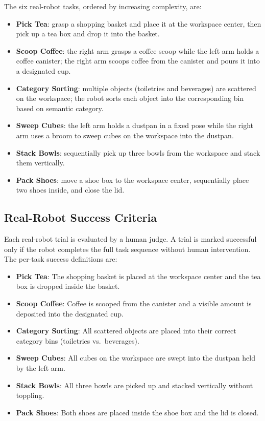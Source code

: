 \documentclass{llmxive}
\begin{document}
The six real-robot tasks, ordered by increasing complexity, are:

\begin{itemize}
    \item \textbf{Pick Tea}: grasp a shopping basket and place it at the workspace center, then pick up a tea box and drop it into the basket.
    \item \textbf{Scoop Coffee}: the right arm grasps a coffee scoop while the left arm holds a coffee canister; the right arm scoops coffee from the canister and pours it into a designated cup.
    \item \textbf{Category Sorting}: multiple objects (toiletries and beverages) are scattered on the workspace; the robot sorts each object into the corresponding bin based on semantic category.
    \item \textbf{Sweep Cubes}: the left arm holds a dustpan in a fixed pose while the right arm uses a broom to sweep cubes on the workspace into the dustpan.
    \item \textbf{Stack Bowls}: sequentially pick up three bowls from the workspace and stack them vertically.
    \item \textbf{Pack Shoes}: move a shoe box to the workspace center, sequentially place two shoes inside, and close the lid.
\end{itemize}

\subsection{Real-Robot Success Criteria}
\label{app:real-robot-success-criteria}

Each real-robot trial is evaluated by a human judge. A trial is marked successful only if the robot completes the full task sequence without human intervention. The per-task success definitions are:

\begin{itemize}
    \item \textbf{Pick Tea}: The shopping basket is placed at the workspace center and the tea box is dropped inside the basket.
    \item \textbf{Scoop Coffee}: Coffee is scooped from the canister and a visible amount is deposited into the designated cup.
    \item \textbf{Category Sorting}: All scattered objects are placed into their correct category bins (toiletries vs.\ beverages).
    \item \textbf{Sweep Cubes}: All cubes on the workspace are swept into the dustpan held by the left arm.
    \item \textbf{Stack Bowls}: All three bowls are picked up and stacked vertically without toppling.
    \item \textbf{Pack Shoes}: Both shoes are placed inside the shoe box and the lid is closed.
\end{itemize}
\end{document}
